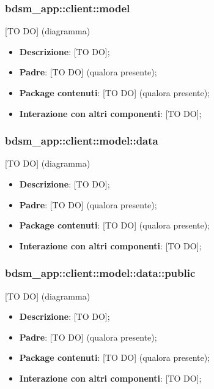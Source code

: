 
	\subsubsection{bdsm\_app::client::model} %
	\label{ssub:bdsm_app_client_model}
	[TO DO] (diagramma) \newline \newline

	\begin{itemize}
		\item \textbf{Descrizione}: [TO DO];
		\item \textbf{Padre}: [TO DO] (qualora presente);
		\item \textbf{Package contenuti}: [TO DO] (qualora presente);
		\item \textbf{Interazione con altri componenti}: [TO DO];
	\end{itemize}


	\subsubsection{bdsm\_app::client::model::data} %
	\label{ssub:bdsm_app_client_model_data}
	[TO DO] (diagramma) \newline \newline

	\begin{itemize}
		\item \textbf{Descrizione}: [TO DO];
		\item \textbf{Padre}: [TO DO] (qualora presente);
		\item \textbf{Package contenuti}: [TO DO] (qualora presente);
		\item \textbf{Interazione con altri componenti}: [TO DO];
	\end{itemize}

	\subsubsection{bdsm\_app::client::model::data::public} %
	\label{ssub:bdsm_app_client_model_data_public}
	[TO DO] (diagramma) \newline \newline

	\begin{itemize}
		\item \textbf{Descrizione}: [TO DO];
		\item \textbf{Padre}: [TO DO] (qualora presente);
		\item \textbf{Package contenuti}: [TO DO] (qualora presente);
		\item \textbf{Interazione con altri componenti}: [TO DO];
	\end{itemize}

